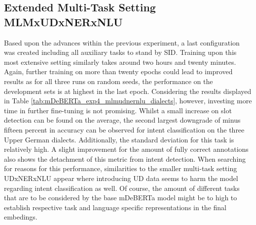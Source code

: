 \documentclass[11pt,a4paper,twoside,openright]{scrbook}
\begin{document}
\begin{table}[!ht]
\caption{Results for the extended multi-task MLMxNERxNLU experiment with mDeBERTa according to Upper German dialects over three random seeds, Avg. = average on languages without English, German and Swiss German, Diff. = average performance difference to mDeBERTa baseline, sd = standard deviation}
\label{tab:mDeBERTa_exp4_mlmnernlu_dialects}
\end{table}





\subsection{Extended Multi-Task Setting MLMxUDxNERxNLU}

Based upon the advances within the previous experiment, a last configuration was created including all auxiliary tasks to stand by SID. Training upon this most extensive setting similarly takes around two hours and twenty minutes. Again, further training on more than twenty epochs could lead to improved results as for all three runs on random seeds, the performance on the development sets is at highest in the last epoch. Considering the results displayed in Table \ref{tab:mDeBERTa_exp4_mlmudnernlu_dialects}, however, investing more time in further fine-tuning is not promising. Whilst a small increase on slot detection can be found on the average, the second largest downgrade of minus fifteen percent in accuracy can be observed for intent classification on the three Upper German dialects. Additionally, the standard deviation for this task is relatively high. A slight improvement for the amount of fully correct annotations also shows the detachment of this metric from intent detection. When searching for reasons for this performance, similarities to the smaller multi-task setting UDxNERxNLU appear where introducing UD data seems to harm the model regarding intent classification as well. Of course, the amount of different tasks that are to be considered by the base mDeBERTa model might be to high to establish respective task and language specific representations in the final embedings.
\end{document}
